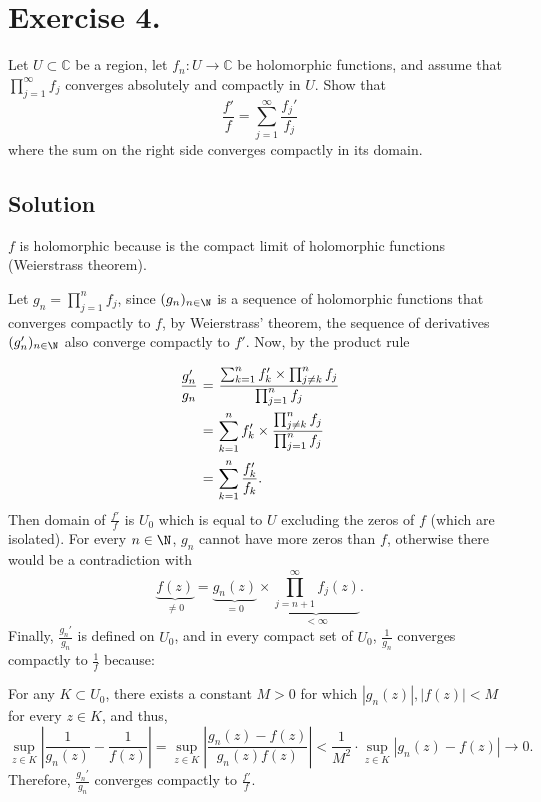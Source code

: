 
\section{Exercise 4.}

Let \(U \subset \mathbb{C}\) be a region, let \(f_n : U \to \mathbb{C}\) be holomorphic functions, and assume that \(\prod_{j=1}^{\infty} f_j\) converges absolutely and compactly in \(U\). Show that
\[
\frac{f'}{f} = \sum_{j=1}^{\infty} \frac{f_j'}{f_j}
\]
where the sum on the right side converges compactly in its domain.

\subsection*{Solution}

$f$ is holomorphic because is the compact limit of holomorphic functions (Weierstrass theorem).

Let $g_n = \prod_{j = 1}^n f_j$, since $(g_n)_{n\in\N}$ is a sequence of holomorphic functions that converges compactly to $f$, by Weierstrass' theorem, the sequence of derivatives $(g_n')_{n\in \N}$ also converge compactly to $f'$. Now, by the product rule
\[ \everymath{\displaystyle}
\arraycolsep=1.8pt\def\arraystretch{2.5}
\begin{array}{rcl}
    \frac{g_n'}{g_n} & = & \frac{\sum_{k = 1}^n f_k' \times \prod_{j \neq k}^n f_j}{\prod_{j = 1}^n f_j}\\
    & = & \sum_{k = 1}^n f_k' \times \frac{\prod_{j \neq k}^n f_j}{\prod_{j = 1}^n f_j}\\
    & = & \sum_{k = 1}^n \frac{f_k'}{f_k}.
\end{array} \]
Then domain of $\frac{f'}{f}$ is $U_0$ which is equal to $U$ excluding the zeros of $f$ (which are isolated). For every $n \in \N$, $g_n$ cannot have more zeros than $f$, otherwise there would be a contradiction with
\[ \underbrace{f(z)}_{\neq 0} = \underbrace{g_n(z)}_{ = 0} \times \underbrace{\prod_{j = n+1}^{\infty} f_j(z)}_{< \infty}. \]
Finally, $\frac{g_n'}{g_n}$ is defined on $U_0$, and in every compact set of $U_0$, $\frac{1}{g_n}$ converges compactly to $\frac{1}{f}$ because: 

For any $K \subset U_0$, there exists a constant $M > 0$ for which $|g_n(z)|, |f(z)| < M$ for every $z \in K$, and thus,
\[ \sup_{z\in K}\left| \frac{1}{g_n(z)} - \frac{1}{f(z)} \right| = \sup_{z\in K} \left| \frac{g_n(z) - f(z)}{g_n(z)f(z)} \right| < \frac{1}{M^2} \cdot \sup_{z\in K}|g_n(z) - f(z)| \to 0. \]
Therefore, $\frac{g_n'}{g_n}$ converges compactly to $\frac{f'}{f}$.